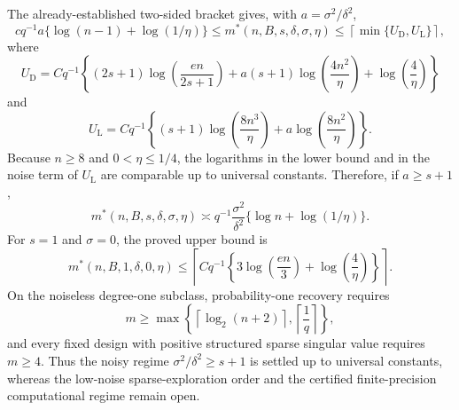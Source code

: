 The already-established two-sided bracket gives, with \(a=\sigma^2/\delta^2\),
\[
 c q^{-1}a\{\log(n-1)+\log(1/\eta)\}
 \le m^*(n,B,s,\delta,\sigma,\eta)
 \le \left\lceil\min\{U_{\mathrm D},U_{\mathrm L}\}\right\rceil,
\]
where
\[
 U_{\mathrm D}=Cq^{-1}\left\{(2s+1)\log\!\left(\frac{en}{2s+1}\right)
 +a(s+1)\log\!\left(\frac{4n^2}{\eta}\right)
 +\log\!\left(\frac4\eta\right)\right\}
\]
and
\[
 U_{\mathrm L}=Cq^{-1}\left\{(s+1)\log\!\left(\frac{8n^3}{\eta}\right)
 +a\log\!\left(\frac{8n^2}{\eta}\right)\right\}.
\]
Because \(n\ge8\) and \(0<\eta\le1/4\), the logarithms in the lower bound and in the noise term of \(U_{\mathrm L}\) are comparable up to universal constants. Therefore, if \(a\ge s+1\),
\[
 m^*(n,B,s,\delta,\sigma,\eta)
 \asymp q^{-1}\frac{\sigma^2}{\delta^2}
 \{\log n+\log(1/\eta)\}.
\]
For \(s=1\) and \(\sigma=0\), the proved upper bound is
\[
 m^*(n,B,1,\delta,0,\eta)
 \le
 \left\lceil Cq^{-1}\left\{3\log\!\left(\frac{en}{3}\right)
 +\log\!\left(\frac4\eta\right)\right\}\right\rceil.
\]
On the noiseless degree-one subclass, probability-one recovery requires
\[
 m\ge
 \max\!\left\{\left\lceil\log_2(n+2)\right\rceil,
 \left\lceil\frac1q\right\rceil\right\},
\]
and every fixed design with positive structured sparse singular value requires \(m\ge4\). Thus the noisy regime \(\sigma^2/\delta^2\ge s+1\) is settled up to universal constants, whereas the low-noise sparse-exploration order and the certified finite-precision computational regime remain open.